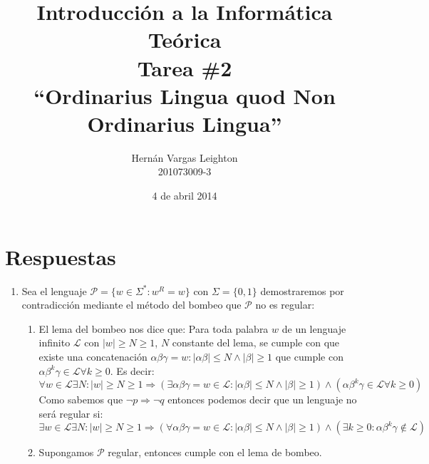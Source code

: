 \documentclass[spanish, fleqn]{article}
\title{
	Introducción a la Informática Teórica \\
	Tarea \#2 \\
	``Ordinarius Lingua quod Non Ordinarius Lingua''
}
\author{
	Hernán Vargas Leighton \\ 201073009-3
}
\date{4 de abril 2014}
\begin{document}
	\maketitle
	\thispagestyle{empty}
	\section*{Respuestas}
	\begin{enumerate}
		\item
			Sea el lenguaje $\mathcal{P} = \{w \in \Sigma^{*}: w^{R} = w\}$ con
			$\Sigma = \{0, 1\}$ demostraremos por contradicción mediante el
			método del bombeo que $\mathcal{P}$ no es regular:
			\begin{enumerate}
				\item
					El lema del bombeo nos dice que: Para toda palabra $w$ de
					un lenguaje infinito $\mathcal{L}$ con $|w| \geq N \geq 1$,
					$N$ constante del lema, se cumple con que existe una 
					concatenación $\alpha\beta\gamma = w: |\alpha\beta| \leq N 
					\land |\beta| \geq 1$ que cumple con $\alpha\beta^{k}
					\gamma \in \mathcal{L} \forall k \geq 0$. Es decir:\\
					\begin{equation*}
						\forall w \in \mathcal{L} \exists N: |w| \geq N \geq 1
						\Rightarrow
						(\exists \alpha\beta\gamma = w \in \mathcal{L}: |\alpha
						\beta| \leq N \land |\beta| \geq 1) \land 
						(\alpha\beta^{k}\gamma \in \mathcal{L} \forall k\geq 0)
					\end{equation*}
					Como sabemos que $\neg p \Rightarrow \neg q$ entonces
					podemos decir que un lenguaje no será regular si:
					\begin{equation*}
						\exists w \in \mathcal{L} \exists N: |w| \geq N \geq 1
						\Rightarrow
						(\forall \alpha\beta\gamma = w \in \mathcal{L}: |\alpha
						\beta| \leq N \land |\beta| \geq 1) \land
						(\exists k \geq 0: \alpha\beta^{k}\gamma \notin 
						\mathcal{L})
					\end{equation*}
				\item
					Supongamos $\mathcal{P}$ regular, entonces cumple con el
					lema de bombeo. 
					\begin{itemize}

\end{itemize}
\end{enumerate}
\end{enumerate}
\end{document}
